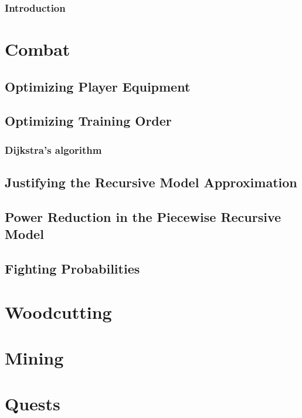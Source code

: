 \documentclass[10pt,a4paper]{report}
\begin{document}
	
	\tableofcontents
	\newpage

	\section*{Introduction}
		
	
	\part{Combat}
		
		
		
		
		
		\chapter{Optimizing Player Equipment}
			
		\chapter{Optimizing Training Order}
			\section{Dijkstra's algorithm}
		
		\begin{appendices}
			\chapter{Justifying the Recursive Model Approximation}\label{app:analytic_form_attempt}
				
			\chapter{Power Reduction in the Piecewise Recursive Model}
				
			\chapter{Fighting Probabilities}
				
		\end{appendices}

	\part{Woodcutting}
	\part{Mining}
	\part{Quests}



\end{document}
